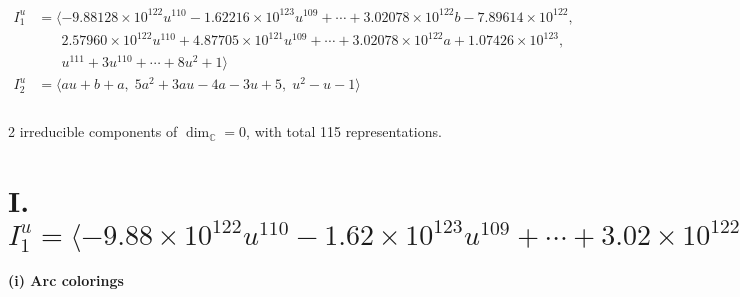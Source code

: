 \documentclass[1p]{elsarticle_modified}
\theoremstyle{definition}
\begin{document}
\begin{align*}
I^u_{1}&=\langle 
-9.88128\times10^{122} u^{110}-1.62216\times10^{123} u^{109}+\cdots+3.02078\times10^{122} b-7.89614\times10^{122},\\
\phantom{I^u_{1}}&\phantom{= \langle  }2.57960\times10^{122} u^{110}+4.87705\times10^{121} u^{109}+\cdots+3.02078\times10^{122} a+1.07426\times10^{123},\\
\phantom{I^u_{1}}&\phantom{= \langle  }u^{111}+3 u^{110}+\cdots+8 u^2+1\rangle \\
I^u_{2}&=\langle 
a u+b+a,\;5 a^2+3 a u-4 a-3 u+5,\;u^2- u-1\rangle \\
\\
\end{align*}
\raggedright * 2 irreducible components of $\dim_{\mathbb{C}}=0$, with total 115 representations.\\
\newpage
\renewcommand{\arraystretch}{1}
\centering \section*{I. $I^u_{1}= \langle -9.88\times10^{122} u^{110}-1.62\times10^{123} u^{109}+\cdots+3.02\times10^{122} b-7.90\times10^{122},\;2.58\times10^{122} u^{110}+4.88\times10^{121} u^{109}+\cdots+3.02\times10^{122} a+1.07\times10^{123},\;u^{111}+3 u^{110}+\cdots+8 u^2+1 \rangle$}
\flushleft \textbf{(i) Arc colorings}\\
\end{document}
